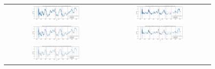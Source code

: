 \begin{figure}[H]
    \raggedright
    \begin{tabular}{c c}
        \includegraphics[width=0.48\textwidth]{Steps/Plots/Daily Predicted Probability of Recession Over Time using LOGISTICREGRESSION model.png} &
        \includegraphics[width=0.48\textwidth]{Steps/Plots/Daily Predicted Probability of Recession Over Time using EASYENSEMBLECLASSIFIER model.png} \\ [-9pt]
        \includegraphics[width=0.48\textwidth]{Steps/Plots/Weekly Predicted Probability of Recession Over Time using LOGISTICREGRESSION model.png} &
        \includegraphics[width=0.48\textwidth]{Steps/Plots/Weekly Predicted Probability of Recession Over Time using EASYENSEMBLECLASSIFIER model.png} \\ [-9pt]
        \includegraphics[width=0.48\textwidth]{Steps/Plots/Monthly Predicted Probability of Recession Over Time using LOGISTICREGRESSION model.png} &

\end{tabular}
\end{figure}
